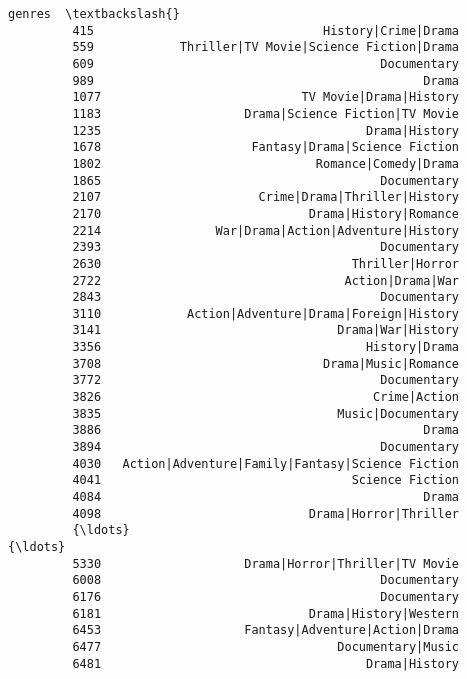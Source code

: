 \documentclass[11pt]{article}
\begin{document}
\begin{Verbatim}[commandchars=\\\{\}]
                                                         genres  \textbackslash{}
         415                                History|Crime|Drama   
         559            Thriller|TV Movie|Science Fiction|Drama   
         609                                        Documentary   
         989                                              Drama   
         1077                            TV Movie|Drama|History   
         1183                    Drama|Science Fiction|TV Movie   
         1235                                     Drama|History   
         1678                     Fantasy|Drama|Science Fiction   
         1802                              Romance|Comedy|Drama   
         1865                                       Documentary   
         2107                      Crime|Drama|Thriller|History   
         2170                             Drama|History|Romance   
         2214                War|Drama|Action|Adventure|History   
         2393                                       Documentary   
         2630                                   Thriller|Horror   
         2722                                  Action|Drama|War   
         2843                                       Documentary   
         3110            Action|Adventure|Drama|Foreign|History   
         3141                                 Drama|War|History   
         3356                                     History|Drama   
         3708                               Drama|Music|Romance   
         3772                                       Documentary   
         3826                                      Crime|Action   
         3835                                 Music|Documentary   
         3886                                             Drama   
         3894                                       Documentary   
         4030   Action|Adventure|Family|Fantasy|Science Fiction   
         4041                                   Science Fiction   
         4084                                             Drama   
         4098                             Drama|Horror|Thriller   
         {\ldots}                                                {\ldots}   
         5330                    Drama|Horror|Thriller|TV Movie   
         6008                                       Documentary   
         6176                                       Documentary   
         6181                             Drama|History|Western   
         6453                    Fantasy|Adventure|Action|Drama   
         6477                                 Documentary|Music   
         6481                                     Drama|History   

\end{Verbatim}
\end{document}
